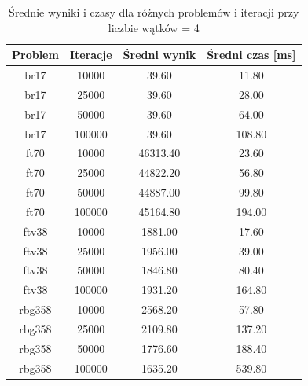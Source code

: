 \begin{table}[h]
\centering
\begin{tabular}{|c|c|c|c|}
\hline
\textbf{Problem} & \textbf{Iteracje} & \textbf{Średni wynik} & \textbf{Średni czas [ms]} \\
\hline
br17 & 10000 & 39.60 & 11.80 \\
br17 & 25000 & 39.60 & 28.00 \\
br17 & 50000 & 39.60 & 64.00 \\
br17 & 100000 & 39.60 & 108.80 \\
\hline
ft70 & 10000 & 46313.40 & 23.60 \\
ft70 & 25000 & 44822.20 & 56.80 \\
ft70 & 50000 & 44887.00 & 99.80 \\
ft70 & 100000 & 45164.80 & 194.00 \\
\hline
ftv38 & 10000 & 1881.00 & 17.60 \\
ftv38 & 25000 & 1956.00 & 39.00 \\
ftv38 & 50000 & 1846.80 & 80.40 \\
ftv38 & 100000 & 1931.20 & 164.80 \\
\hline
rbg358 & 10000 & 2568.20 & 57.80 \\
rbg358 & 25000 & 2109.80 & 137.20 \\
rbg358 & 50000 & 1776.60 & 188.40 \\
rbg358 & 100000 & 1635.20 & 539.80 \\
\hline
\end{tabular}
\caption{Średnie wyniki i czasy dla różnych problemów i iteracji przy liczbie wątków = 4}
\label{tab:srednie_wyniki_{threads}}
\end{table}
